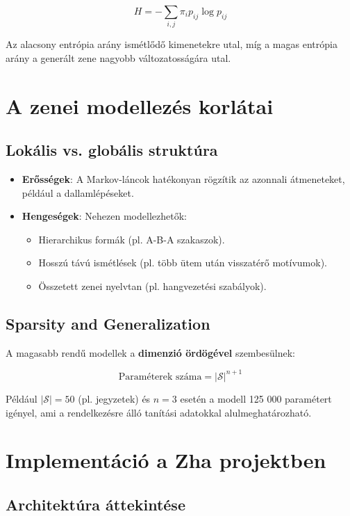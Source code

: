 \[
H = -\sum_{i,j} \pi_i p_{ij} \log p_{ij}
\]

Az alacsony entrópia arány ismétlődő kimenetekre utal, míg a magas entrópia arány a generált zene nagyobb változatosságára utal.

\section{A zenei modellezés korlátai}

\subsection{Lokális vs. globális struktúra}

\begin{itemize}
    \item \textbf{Erősségek}: A Markov-láncok hatékonyan rögzítik az azonnali átmeneteket, például a dallamlépéseket.
    \item \textbf{Hengeségek}: Nehezen modellezhetők:
    \begin{itemize}
        \item Hierarchikus formák (pl. A-B-A szakaszok).
        \item Hosszú távú ismétlések (pl. több ütem után visszatérő motívumok).
        \item Összetett zenei nyelvtan (pl. hangvezetési szabályok).
    \end{itemize}
\end{itemize}

\subsection{Sparsity and Generalization}

A magasabb rendű modellek a \textbf{dimenzió ördögével} szembesülnek:

\[
\text{Paraméterek száma} = |\mathcal{S}|^{n+1}
\]

Például \( |\mathcal{S}| = 50 \) (pl. jegyzetek) és \( n = 3 \) esetén a modell 125 000 paramétert igényel, ami a rendelkezésre álló tanítási adatokkal alulmeghatározható.

\section{Implementáció a Zha projektben}

\subsection{Architektúra áttekintése}

